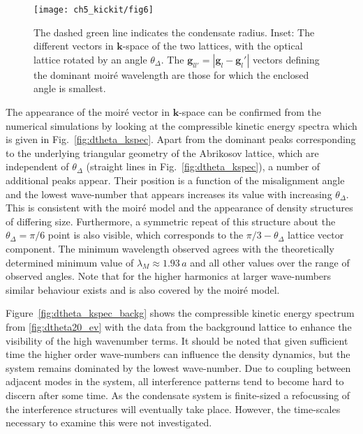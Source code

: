 \begin{figure}
    \centering
	\texttt{[image: ch5\_kickit/fig6]}
	\caption[Size of the resulting moir\'e super-structures as a function of the relative angle between the vortex and optical lattice.]{The dashed green line indicates the condensate radius. Inset: The different vectors in $\mathbf{k}$-space of the two lattices, with the optical lattice rotated by an angle $\theta_\Delta$. The $\mathbf{g}_{ll'} = |\mathbf{g}_l - \mathbf{g}_l'|$ vectors defining the dominant moir\'e wavelength are those for which the enclosed angle is smallest. }
	\label{fig:moire_lambda_1}
\end{figure}

    The appearance of the moir\'e vector in $\mathbf{k}$-space can be confirmed from the numerical simulations by looking at the compressible kinetic energy spectra which is given in Fig.~\ref{fig:dtheta_kspec}. Apart from the dominant peaks corresponding to the underlying triangular geometry of the Abrikosov lattice, which are independent of $\theta_\Delta$ (straight lines in Fig.~\ref{fig:dtheta_kspec}), a number of additional peaks appear. Their position is a function of the misalignment angle and the lowest wave-number that appears increases its value with increasing $\theta_\Delta$. This is consistent with the moir\'e model and the appearance of density structures of differing size. Furthermore, a symmetric repeat of this structure about the $\theta_\Delta=\pi/6$ point is also visible, which corresponds to the $\pi/3 - \theta_\Delta$ lattice vector component. The minimum wavelength observed agrees with the theoretically determined minimum value of $\lambda_M\approx 1.93\,a$ and all other values over the range of observed angles. Note that for the higher harmonics at larger wave-numbers similar behaviour exists and is also covered by the moir\'e model.

    Figure~\ref{fig:dtheta_kspec_backg} shows the compressible kinetic energy spectrum from \ref{fig:dtheta20_ev} with the data from the background lattice to enhance the visibility of the high wavenumber terms. It should be noted that given sufficient time the higher order wave-numbers can influence the density dynamics, but the system remains dominated by the lowest wave-number. Due to coupling between adjacent modes in the system, all interference patterns tend to become hard to discern after some time. As the condensate system is finite-sized a refocussing of the interference structures will eventually take place. However, the time-scales necessary to examine this were not investigated.

